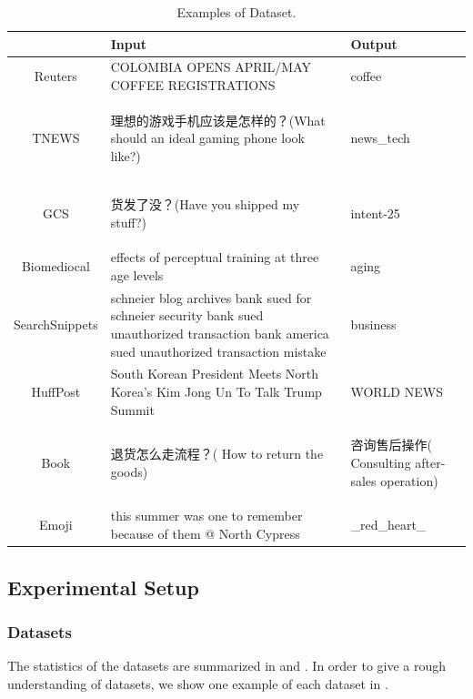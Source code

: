 \begin{table}[th]
\scriptsize
\centering
\begin{tabular}{c P{2cm} P{2cm}}
\hline
& Input     &      Output          \\ \hline
Reuters     & COLOMBIA OPENS APRIL/MAY COFFEE REGISTRATIONS & coffee         \\ \hline
TNEWS & \begin{CJK}{UTF8}{gbsn}理想的游戏手机应该是怎样的？(What should an ideal gaming phone look like?)\end{CJK} & news\_tech \\ \hline
GCS     & \begin{CJK}{UTF8}{gbsn}货发了没？(Have you shipped my stuff?)\end{CJK} & intent-25          \\ \hline
Biomediocal & effects of perceptual training at three age levels & aging \\ \hline

SearchSnippets & schneier blog archives bank sued for schneier security bank sued unauthorized transaction bank america sued unauthorized transaction mistake & business\\ \hline
HuffPost &South Korean President Meets North Korea's Kim Jong Un To Talk Trump Summit &WORLD NEWS\\ \hline
Book & \begin{CJK}{UTF8}{gbsn}退货怎么走流程？(
	How to return the goods)\end{CJK}	& \begin{CJK}{UTF8}{gbsn}咨询售后操作(
	Consulting after-sales operation)\end{CJK} \\ \hline
Emoji & this summer was one to remember because of them @ North Cypress& \_red\_heart\_ \\ \hline

\end{tabular}
\caption{Examples of Dataset.}
\label{table:exampleOfDataset}
\end{table}

\subsection{Experimental Setup}
\subsubsection{Datasets} 

The statistics of the datasets are summarized in 
and .
In order to give a rough understanding of datasets, we show one example of
each dataset in . 


